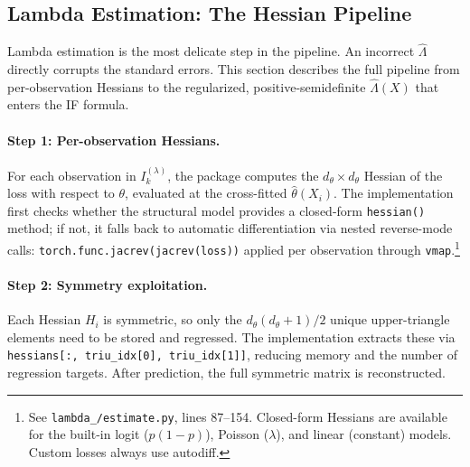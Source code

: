 \subsection{Lambda Estimation: The Hessian Pipeline}\label{sec:lambda_est}

Lambda estimation is the most delicate step in the pipeline. An incorrect $\hat{\Lambda}$ directly corrupts the standard errors. This section describes the full pipeline from per-observation Hessians to the regularized, positive-semidefinite $\hat{\Lambda}(X)$ that enters the IF formula.

\paragraph{Step 1: Per-observation Hessians.} For each observation in $I_k^{(\lambda)}$, the package computes the $d_\theta \times d_\theta$ Hessian of the loss with respect to $\theta$, evaluated at the cross-fitted $\hat{\theta}(X_i)$. The implementation first checks whether the structural model provides a closed-form \texttt{hessian()} method; if not, it falls back to automatic differentiation via nested reverse-mode calls: \texttt{torch.func.jacrev(jacrev(loss))} applied per observation through \texttt{vmap}.\footnote{See \texttt{lambda\_/estimate.py}, lines 87--154. Closed-form Hessians are available for the built-in logit ($p(1-p)$), Poisson ($\lambda$), and linear (constant) models. Custom losses always use autodiff.}

\paragraph{Step 2: Symmetry exploitation.} Each Hessian $H_i$ is symmetric, so only the $d_\theta(d_\theta + 1)/2$ unique upper-triangle elements need to be stored and regressed. The implementation extracts these via \texttt{hessians[:, triu\_idx[0], triu\_idx[1]]}, reducing memory and the number of regression targets. After prediction, the full symmetric matrix is reconstructed.

